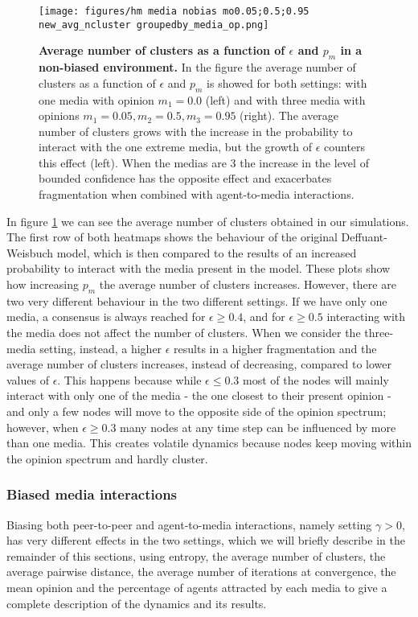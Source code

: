 \documentclass[10pt,letterpaper]{article}
\begin{document}
\begin{figure}
    \centering
    \texttt{[image: figures/hm media nobias mo0.05;0.5;0.95 new\_avg\_ncluster groupedby\_media\_op.png]}
    \caption{\textbf{Average number of clusters as a function of $\epsilon$ and $p_m$ in a non-biased environment.} In the figure the average number of clusters as a function of $\epsilon$ and $p_m$ is showed for both settings: with one media with opinion $m_1 = 0.0$ (left) and with three media with opinions $m_1=0.05, m_2 = 0.5, m_3=0.95$ (right). The average number of clusters grows with the increase in the probability to interact with the one extreme media, but the growth of $\epsilon$ counters this effect (left). When the medias are $3$ the increase in the level of bounded confidence has the opposite effect and exacerbates fragmentation when combined with agent-to-media interactions.}
    \label{fig:gammazero}
\end{figure}

In figure \ref{fig:gammazero} we can see the average number of clusters obtained in our simulations. The first row of both heatmaps shows the behaviour of the original Deffuant-Weisbuch model, which is then compared to the results of an increased probability to interact with the media present in the model. These plots show how increasing $p_m$ the average number of clusters increases. However, there are two very different behaviour in the two different settings. If we have only one media, a consensus is always reached for $\epsilon \geq 0.4$, and for $\epsilon \geq 0.5$ interacting with the media does not affect the number of clusters. When we consider the three-media setting, instead, a higher $\epsilon$ results in a higher fragmentation and the average number of clusters increases, instead of decreasing, compared to lower values of $\epsilon$. This happens because while $\epsilon \leq 0.3$ most of the nodes will mainly interact with only one of the media - the one closest to their present opinion - and only a few nodes will move to the opposite side of the opinion spectrum; however, when $\epsilon \ge 0.3$ many nodes at any time step can be influenced by more than one media. This creates volatile dynamics because nodes keep moving within the opinion spectrum and hardly cluster. 

\subsubsection{Biased media interactions}
Biasing both peer-to-peer and agent-to-media interactions, namely setting $\gamma > 0$, has very different effects in the two settings, which we will briefly describe in the remainder of this sections, using entropy, the average number of clusters, the average pairwise distance, the average number of iterations at convergence, the mean opinion and the percentage of agents attracted by each media to give a complete description of the dynamics and its results.
\end{document}
